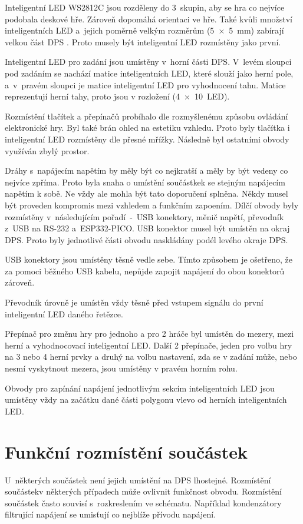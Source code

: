   Inteligentní LED WS2812C jsou rozděleny do 3~skupin, aby se hra co nejvíce podobala deskové hře. Zároveň dopomáhá orientaci ve hře.
  Také kvůli množství inteligentních LED a~jejich poměrně velkým rozměrům (5~$\times$~5~mm) zabírají velkou část DPS 
  \cite{WS2812C_datasheet}. Proto musely být inteligentní LED rozmístěny jako první.

  Inteligentní LED pro zadání jsou umístěny v~horní části DPS. V~levém sloupci pod zadáním se nachází matice inteligentních LED, které slouží jako herní 
  pole, a~v~pravém sloupci je matice inteligentní LED pro vyhodnocení tahu. Matice reprezentují herní tahy, proto jsou v rozložení (4~$\times$~10~LED).
  
  Rozmístění tlačítek a přepínačů probíhalo dle 
  rozmyšlenému způsobu ovládání elektronické hry. Byl také brán ohled na estetiku vzhledu. Proto byly tlačítka i inteligentní LED
  rozmístěny dle přesné mřížky. Následně byl ostatními obvody využíván zbylý prostor. 

  Dráhy s~napájecím napětím by měly být co nejkratší a měly by být vedeny co nejvíce zpříma. Proto byla snaha o umístění součástkek
  se stejným napájecím napětím k sobě. Ne vždy ale mohla být tato doporučení splněna. Někdy musel být proveden kompromis mezi vzhledem a funkčním 
  zapoením. 
  Dílčí obvody byly rozmístěny v~následujícím pořadí~-~USB konektory, měnič napětí, převodník z~USB 
  na RS-232 a~ESP332-PICO. USB konektor musel být umístěn na okraj DPS. Proto byly jednotlivé části obvodu naskládány podél levého okraje DPS.

  USB konektory jsou umístěny těsně vedle sebe. Tímto způsobem je ošetřeno, že za pomoci běžného USB kabelu, nepůjde zapojit napájení do obou 
  konektorů zároveň. 

  Převodník úrovně je umístěn vždy těsně před vstupem signálu do první inteligentní LED daného řetězce.

  Přepínač pro změnu hry pro jednoho a pro 2 hráče byl umístěn do mezery, mezi herní a vyhodnocovací inteligentní LED. Další 2 přepínače, jeden 
  pro volbu hry na 3 nebo 4 herní prvky a druhý na volbu nastavení, zda se v zadání může, nebo nesmí vyskytnout mezera, jsou umístěny v pravém 
  horním rohu. 

  Obvody pro zapínání napájení jednotlivým sekcím inteligentních LED jsou umístěny vždy na začátku dané části polygonu vlevo od herních inteligentních
  LED.

  \section{Funkční rozmístění součástek}
  U~některých součástek není jejich umístění na DPS lhostejné. Rozmístění součástekv některých případech může ovlivnit funkčnost obvodu. 
  Rozmístění součástek často souvisí s~rozkreslením ve schématu. Například kondenzátory filtrující napájení se umisťují co nejblíže přívodu napájení.

